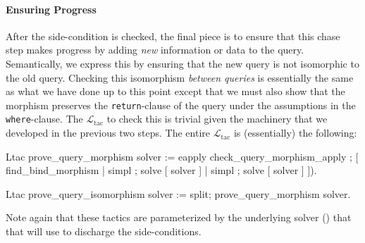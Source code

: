 \documentclass[preprint]{sigplanconf}
\newcommand{\WHERE}{{\tt where} \ }
\newcommand{\RETURN}{{\tt return} \ }
\newcommand{\ltac}[0]{\ensuremath{\mathcal{L}_{\mathrm{tac}}}}
\begin{document}
\paragraph{Ensuring Progress}
After the side-condition is checked, the final piece is to ensure that this chase step makes progress by adding \emph{new} information or data to the query.
Semantically, we express this by ensuring that the new query is not isomorphic to the old query.
Checking this isomorphism \emph{between queries} is essentially the same as what we have done up to this point except that we must also show that the morphism preserves the {\tt return}-clause of the query under the assumptions in the {\tt where}-clause.
The \ltac{} to check this is trivial given the machinery that we developed in the previous two steps.
The entire \ltac{} is (essentially) the following:
\begin{coq}
Ltac prove_query_morphism solver :=
  eapply check_query_morphism_apply ;
    [ find_bind_morphism
    | simpl ; solve [ solver ]
    | simpl ; solve [ solver ] ]).

Ltac prove_query_isomorphism solver :=
  split; prove_query_morphism solver.
\end{coq}
Note again that these tactics are parameterized by the underlying solver () that that will use to discharge the side-conditions.
\end{document}
